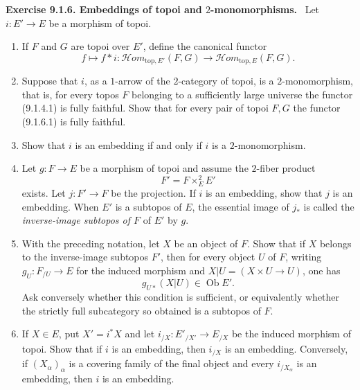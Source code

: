 \documentclass[11pt]{article}
\newcommand{\Ob}{\operatorname{Ob}}
\newenvironment{remarktext}[1]{\par\medskip\noindent\textbf{#1.}\ }{\par\medskip}
\begin{document}
\begin{remarktext}{Exercise 9.1.6. Embeddings of topoi and \(2\)-monomorphisms}
Let \(i:E'\to E\) be a morphism of topoi.
\begin{enumerate}[label=\alph*)]
\item If \(F\) and \(G\) are topoi over \(E'\), define the canonical functor
\[
f\longmapsto f*i:\mathcal{H}om_{\mathrm{top},E'}(F,G)\longrightarrow \mathcal{H}om_{\mathrm{top},E}(F,G).
\tag{9.1.6.1}
\]
\item Suppose that \(i\), as a \(1\)-arrow of the \(2\)-category of topoi, is a \(2\)-monomorphism, that is, for every topos \(F\) belonging to a sufficiently large universe the functor (9.1.4.1) is fully faithful. Show that for every pair of topoi \(F,G\) the functor (9.1.6.1) is fully faithful.
\item Show that \(i\) is an embedding if and only if \(i\) is a \(2\)-monomorphism.
\item Let \(g:F\to E\) be a morphism of topoi and assume the \(2\)-fiber product
\[
F'=F\times_E^2 E'
\]
exists. Let \(j:F'\to F\) be the projection. If \(i\) is an embedding, show that \(j\) is an embedding. When \(E'\) is a subtopos of \(E\), the essential image of \(j_*\) is called the \emph{inverse-image subtopos of \(F\)} of \(E'\) by \(g\).
\item With the preceding notation, let \(X\) be an object of \(F\). Show that if \(X\) belongs to the inverse-image subtopos \(F'\), then for every object \(U\) of \(F\), writing \(g_U:F_{/U}\to E\) for the induced morphism and \(X|U=(X\times U\to U)\), one has
\[
g_{U*}(X|U)\in \Ob E'.
\]
Ask conversely whether this condition is sufficient, or equivalently whether the strictly full subcategory so obtained is a subtopos of \(F\).
\item If \(X\in E\), put \(X'=i^*X\) and let \(i_{/X}:E'_{/X'}\to E_{/X}\) be the induced morphism of topoi. Show that if \(i\) is an embedding, then \(i_{/X}\) is an embedding. Conversely, if \((X_\alpha)_\alpha\) is a covering family of the final object and every \(i_{/X_\alpha}\) is an embedding, then \(i\) is an embedding.
\end{enumerate}
\end{remarktext}
\end{document}
